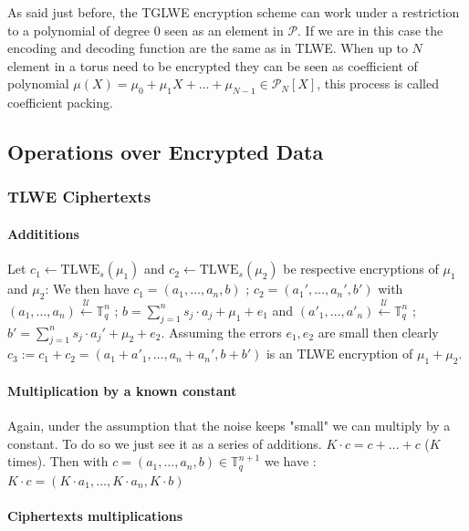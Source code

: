 \documentclass{article}
\newcommand{\T}{\mathbb{T}}
\newcommand{\Pcal}{\mathcal{P}}
\newcommand{\Sunif}{\xleftarrow{\mathcal{U}}}
\theoremstyle{definition}
\theoremstyle{Theorem}
\begin{document}
As said just before, the TGLWE encryption scheme can work under a restriction to a polynomial of degree 0 seen as an element in $\Pcal$. If we are in this case the encoding and decoding function are the same as in TLWE.
When up to $N$ element in a torus need to be encrypted they can be seen as coefficient of polynomial $\mu(X)=\mu_0 + \mu_1X + \dots + \mu_{N-1} \in \Pcal_N[X]$, this process is called coefficient packing. 

\subsection{Operations over Encrypted Data}

\subsubsection{TLWE Ciphertexts}

\paragraph{Addititions}
Let $c_1 \gets \text{TLWE}_s(\mu_1)$ and $c_2 \gets \text{TLWE}_s(\mu_2)$ be respective encryptions of $\mu_1$ and $\mu_2$: 
We then have $c_1 = (a_1, \dots, a_n, b)$ ; $c_2 = (a_1', \dots, a_n', b')$ with $(a_1, \dots, a_n)\Sunif \T_q^n$ ; $b=\sum_{j=1}^n s_j\cdot a_j + \mu_1 +e_1$ and $(a'_1, \dots, a'_n)\Sunif \T_q^n$ ; $b'=\sum_{j=1}^n s_j\cdot a_j' + \mu_2 +e_2$. 
Assuming the errors $e_1, e_2$ are small then clearly $c_3 := c_1 + c_2 = (a_1 + a'_1, \dots, a_n + a_n', b + b')$ is an TLWE encryption of $\mu_1 + \mu_2$.

\paragraph{Multiplication by a known constant}

Again, under the assumption that the noise keeps "small" we can multiply by a constant. To do so we just see it as a series of additions. $K \cdot c = c + \dots + c$ ($K$ times). Then with $c = (a_1, \dots, a_n, b) \in \T_q^{n+1}$ we have : $K \cdot c = (K \cdot a_1, \dots,K \cdot  a_n, K \cdot b) $ 

\paragraph{Ciphertexts multiplications}
\end{document}
